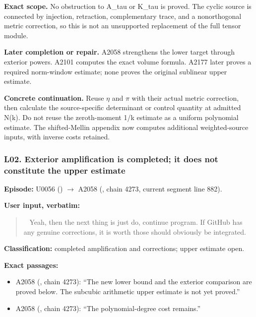 \textbf{Exact scope.} No obstruction to A\_tau or K\_tau is proved. The
cyclic source is connected by injection, retraction, complementary
trace, and a nonorthogonal metric correction, so this is not an
unsupported replacement of the full tensor module.

\textbf{Later completion or repair.} A2058 strengthens the lower target
through exterior powers. A2101 computes the exact volume formula. A2177
later proves a required norm-window estimate; none proves the original
sublinear upper estimate.

\textbf{Concrete continuation.} Reuse
\allowbreak{}\ensuremath{η}\allowbreak{} and
\allowbreak{}\ensuremath{π}\allowbreak{} with their actual metric
correction, then calculate the source-specific determinant or control
quantity at admitted N(k). Do not reuse the zeroth-moment 1/k estimate
as a uniform polynomial estimate. The shifted-Mellin appendix now
computes additional weighted-source inputs, with inverse costs retained.

\subsubsection{L02. Exterior amplification is completed; it does not
constitute the upper
estimate}\label{l02.-exterior-amplification-is-completed-it-does-not-constitute-the-upper-estimate}

\textbf{Episode:} U0056
(\protect{})
\allowbreak{}\ensuremath{→}\allowbreak{} A2058
(\protect{}, chain 4273,
current segment line 882).

\textbf{User input, verbatim:}

\begin{quote}
~ Yeah, then the next thing is just do, continue program. If GitHub has
any genuine corrections, it is worth those should obviously be
integrated.
\end{quote}

\textbf{Classification:} completed amplification and corrections; upper
estimate open.

\textbf{Exact passages:}

\begin{itemize}
\tightlist
\item
  A2058 (\protect{}, chain
  4273): ``The new lower bound and the exterior comparison are proved
  below. The subcubic arithmetic upper estimate is not yet proved.''
\item
  A2058 (\protect{}, chain
  4273): ``The polynomial-degree cost remains.''
\end{itemize}

